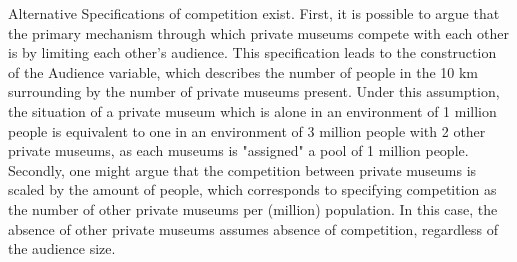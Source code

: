 \documentclass[12pt]{article}
\begin{document}
Alternative Specifications of competition exist.
First, it is possible to argue that the primary mechanism through which private museums compete with each other is by limiting each other's audience.
This specification leads to the construction of the Audience variable, which describes the number of people in the 10 km surrounding by the number of private museums present.
Under this assumption, the situation of a private museum which is alone in an environment of 1 million people is equivalent to one in an environment of 3 million people with 2 other private museums, as each museums is "assigned" a pool of 1 million people.
Secondly, one might argue that the competition between private museums is scaled by the amount of people, which corresponds to specifying competition as the number of other private museums per (million) population.
In this case, the absence of other private museums assumes absence of competition, regardless of the audience size.
\end{document}

